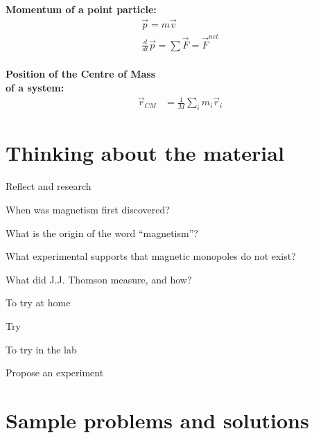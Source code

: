 \newpage
\begin{importantEquations}
\medskip
\begin{multicols}{2}
\textbf{Momentum of a point particle:}
\begin{align*}
\vec p = m\vec v \\
\frac{d}{dt}\vec p = \sum \vec F = \vec F^{net}
\end{align*}
\columnbreak
\\
\textbf{Position of the Centre of Mass \\ of a system:}
\begin{align*}
\vec r_{CM} &=\frac{1}{M}\sum_i m_i\vec r_i 
\end{align*}
\medskip
\end{multicols}
\end{importantEquations}

\newpage
\section{Thinking about the material}

\begin{chapteractivity}{Reflect and research}
{
\item When was magnetism first discovered?
\item What is the origin of the word ``magnetism''?
\item What experimental supports that magnetic monopoles do not exist?
\item What did J.J. Thomson measure, and how?
}
\end{chapteractivity}

\begin{chapteractivity}{To try at home}
{
\item Try
}
\end{chapteractivity}

\begin{chapteractivity}{To try in the lab}
{
\item Propose an experiment
}
\end{chapteractivity}

\newpage
\section{Sample problems and solutions}

